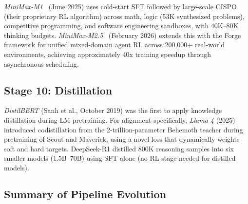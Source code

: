\documentclass[12pt]{article}
\begin{document}
\textit{MiniMax-M1}~\cite{MiniMax2025M1} (June 2025) uses cold-start SFT followed by large-scale CISPO (their proprietary RL algorithm) across math, logic (53K synthesized problems), competitive programming, and software engineering sandboxes, with 40K--80K thinking budgets. \textit{MiniMax-M2.5}~\cite{MiniMax2025Forge} (February 2026) extends this with the Forge framework for unified mixed-domain agent RL across 200,000+ real-world environments, achieving approximately 40x training speedup through asynchronous scheduling.

\subsection{Stage 10: Distillation}

\textit{DistilBERT} (Sanh et al., October 2019) was the first to apply knowledge distillation during LM pretraining. For alignment specifically, \textit{Llama 4} (2025) introduced codistillation from the 2-trillion-parameter Behemoth teacher during pretraining of Scout and Maverick, using a novel loss that dynamically weights soft and hard targets. DeepSeek-R1 distilled 800K reasoning samples into six smaller models (1.5B--70B) using SFT alone (no RL stage needed for distilled models).

\subsection{Summary of Pipeline Evolution}
\end{document}
